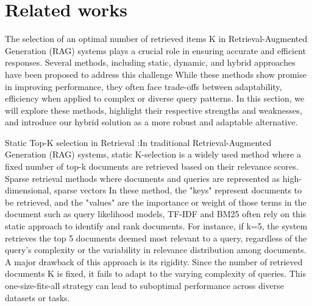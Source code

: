 \documentclass[review]{jair}
\begin{document}
\section{Related works}\label{sec2}
The selection of an optimal number of retrieved items K in Retrieval-Augmented Generation (RAG) systems plays a crucial role in ensuring accurate and efficient responses. Several methods, including static, dynamic, and hybrid approaches have been proposed to address this challenge While these methods show promise in improving performance, they often face trade-offs between adaptability, efficiency when applied to complex or diverse query patterns. In this section, we will explore these methods, highlight their respective strengths and weaknesses, and introduce our hybrid solution as a more robust and adaptable alternative. 

Static Top-K selection in Retrieval :In traditional Retrieval-Augmented Generation (RAG) systems, static K-selection is a widely used method where a fixed number of top-k documents are retrieved based on their relevance scores. Sparse retrieval\cite{bai2020spartermlearningtermbasedsparse} methods where documents and queries are represented as high-dimensional, sparse vectors In these method, the "keys" represent documents to be retrieved, and the "values" are the importance or weight of those terms in the document such as query likelihood models\cite{Lafferty2001}, TF-IDF\cite{Robertson1997} and BM25\cite{Zaragoza2009} often rely on this static approach to identify and rank documents. For instance, if k=5, the system retrieves the top 5 documents deemed most relevant to a query, regardless of the query's complexity or the variability in relevance distribution among documents.
A major drawback of this approach is its rigidity. Since the number of retrieved documents K is fixed, it fails to adapt to the varying complexity of queries. This one-size-fits-all strategy can lead to suboptimal performance across diverse datasets or tasks.
\end{document}
